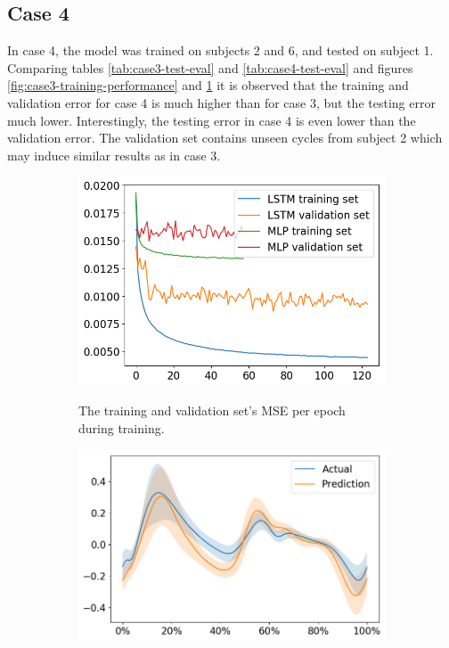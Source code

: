 \documentclass[../main.tex]{subfiles}
\begin{document}
\subsection{Case 4}
\label{sec:results-case4}
In case 4, the model was trained on subjects 2 and 6, and tested on subject 1.
Comparing tables \ref{tab:case3-test-eval} and \ref{tab:case4-test-eval} and figures \ref{fig:case3-training-performance} and \ref{fig:case4-training-performance} it is observed that the training and validation error for case 4 is much higher than for case 3, but the testing error much lower.
Interestingly, the testing error in case 4 is even lower than the validation error.
The validation set contains unseen cycles from subject 2 which may induce similar results as in case 3.
\begin{figure}[!htb]
    \captionsetup[subfigure]{aboveskip=-12pt}
     \centering
     \begin{subfigure}[b]{0.475\textwidth}
         \centering
         \includegraphics[width=\textwidth]{img/results/training_history/Case4_LSTMvsMLP_training.png}
         \label{fig:case4-training-performance}
         \caption{The training and validation set's \ac{MSE} per epoch during training.}
     \end{subfigure}
     \hfill
     \begin{subfigure}[b]{0.515\textwidth}
         \centering
         \includegraphics[width=\textwidth]{img/results/test_prediction_evaluation/Case4_LSTM_test_prediction.png}

\end{subfigure}
\end{figure}
\end{document}
